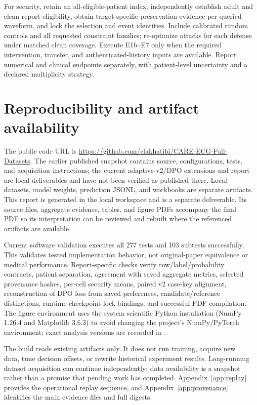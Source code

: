 For security, retain an all-eligible-patient index, independently establish adult and clean-report eligibility, obtain target-specific preservation evidence per queried waveform, and lock the selection and event identities. Include calibrated random controls and all requested constraint families; re-optimize attacks for each defense under matched clean coverage. Execute E1b--E7 only when the required intervention, transfer, and authenticated-history inputs are available. Report numerical and clinical endpoints separately, with patient-level uncertainty and a declared multiplicity strategy.

\section{Reproducibility and artifact availability}
\label{sec:reproducibility}
The public code URL is \url{https://github.com/elakhatibi/CARE-ECG-Full-Datasets}. The earlier published snapshot contains source, configurations, tests, and acquisition instructions; the current adaptive-v2/DPO extensions and report are local deliverables and have not been verified as published there. Local datasets, model weights, prediction JSONL, and workbooks are separate artifacts. This report is generated in the local workspace and is a separate deliverable. Its source files, aggregate evidence, tables, and figure PDFs accompany the final PDF so its interpretation can be reviewed and rebuilt where the referenced artifacts are available.

Current software validation executes all 277 tests and 103 subtests successfully. This validates tested implementation behavior, not original-paper equivalence or medical performance. Report-specific checks verify row/label/probability contracts, patient separation, agreement with saved aggregate metrics, selected provenance hashes, per-cell security means, paired v2 case-key alignment, reconstruction of DPO loss from saved preferences, candidate/reference distinctions, runtime checkpoint-lock bindings, and successful PDF compilation. The figure environment uses the system scientific Python installation (NumPy 1.26.4 and Matplotlib 3.6.3) to avoid changing the project's NumPy/PyTorch environment; exact analysis versions are recorded in .

The build reads existing artifacts only. It does not run training, acquire new data, tune decision offsets, or rewrite historical experiment results. Long-running dataset acquisition can continue independently; data availability is a snapshot rather than a promise that pending work has completed. Appendix~\ref{app:replay} provides the operational replay sequence, and Appendix~\ref{app:provenance} identifies the main evidence files and full digests.

